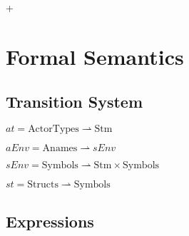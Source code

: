 +\section{Formal Semantics}
\subsection{Transition System}

\begin{center}
$at = \text{ActorTypes} \rightharpoonup \text{Stm}$

$aEnv = \text{Anames} \rightharpoonup sEnv$

$sEnv = \text{Symbols} \rightharpoonup \text{Stm} \times \text{Symbols}$

$st = \text{Structs} \rightharpoonup \text{Symbols}$
\end{center}

\subsection{Expressions}
